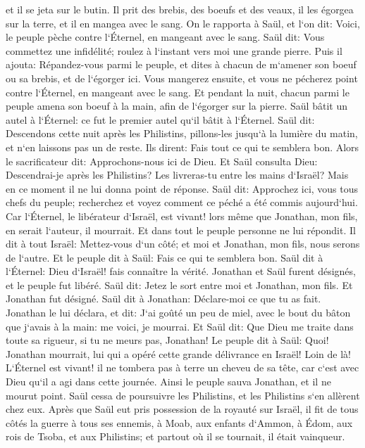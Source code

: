 \verse et il se jeta sur le butin. Il prit des brebis, des boeufs et des veaux, il les égorgea sur la terre, et il en mangea avec le sang. 
\verse On le rapporta à Saül, et l`on dit: Voici, le peuple pèche contre l`Éternel, en mangeant avec le sang. Saül dit: Vous commettez une infidélité; roulez à l`instant vers moi une grande pierre. 
\verse Puis il ajouta: Répandez-vous parmi le peuple, et dites à chacun de m`amener son boeuf ou sa brebis, et de l`égorger ici. Vous mangerez ensuite, et vous ne pécherez point contre l`Éternel, en mangeant avec le sang. Et pendant la nuit, chacun parmi le peuple amena son boeuf à la main, afin de l`égorger sur la pierre. 
\verse Saül bâtit un autel à l`Éternel: ce fut le premier autel qu`il bâtit à l`Éternel. 
\verse Saül dit: Descendons cette nuit après les Philistins, pillons-les jusqu`à la lumière du matin, et n`en laissons pas un de reste. Ils dirent: Fais tout ce qui te semblera bon. Alors le sacrificateur dit: Approchons-nous ici de Dieu. 
\verse Et Saül consulta Dieu: Descendrai-je après les Philistins? Les livreras-tu entre les mains d`Israël? Mais en ce moment il ne lui donna point de réponse. 
\verse Saül dit: Approchez ici, vous tous chefs du peuple; recherchez et voyez comment ce péché a été commis aujourd`hui. 
\verse Car l`Éternel, le libérateur d`Israël, est vivant! lors même que Jonathan, mon fils, en serait l`auteur, il mourrait. Et dans tout le peuple personne ne lui répondit. 
\verse Il dit à tout Israël: Mettez-vous d`un côté; et moi et Jonathan, mon fils, nous serons de l`autre. Et le peuple dit à Saül: Fais ce qui te semblera bon. 
\verse Saül dit à l`Éternel: Dieu d`Israël! fais connaître la vérité. Jonathan et Saül furent désignés, et le peuple fut libéré. 
\verse Saül dit: Jetez le sort entre moi et Jonathan, mon fils. Et Jonathan fut désigné. 
\verse Saül dit à Jonathan: Déclare-moi ce que tu as fait. Jonathan le lui déclara, et dit: J`ai goûté un peu de miel, avec le bout du bâton que j`avais à la main: me voici, je mourrai. 
\verse Et Saül dit: Que Dieu me traite dans toute sa rigueur, si tu ne meurs pas, Jonathan! 
\verse Le peuple dit à Saül: Quoi! Jonathan mourrait, lui qui a opéré cette grande délivrance en Israël! Loin de là! L`Éternel est vivant! il ne tombera pas à terre un cheveu de sa tête, car c`est avec Dieu qu`il a agi dans cette journée. Ainsi le peuple sauva Jonathan, et il ne mourut point. 
\verse Saül cessa de poursuivre les Philistins, et les Philistins s`en allèrent chez eux. 
\verse Après que Saül eut pris possession de la royauté sur Israël, il fit de tous côtés la guerre à tous ses ennemis, à Moab, aux enfants d`Ammon, à Édom, aux rois de Tsoba, et aux Philistins; et partout où il se tournait, il était vainqueur. 
